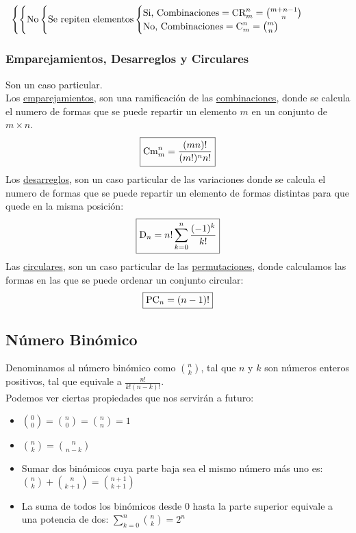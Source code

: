 \[\begin{cases}
\begin{cases}
                        \textnormal{No}\begin{cases}
                                \textnormal{Se repiten elementos}
                                \begin{cases}
                                        \textnormal{Si, Combinaciones} = \textnormal{CR}_m^n=\binom{m+n-1}{n} \\
                                        \textnormal{No, Combinaciones} = \textnormal{C}^n_m = \binom{m}{n}
                                \end{cases}
                        \end{cases}
                \end{cases}
        \end{cases}
\]
\subsubsection{Emparejamientos, Desarreglos y Circulares}
 Son un caso particular. \\ Los \underline{emparejamientos}, son una ramificación de las \underline{combinaciones}, donde se calcula el numero de formas que se puede repartir un elemento \(m\) en un conjunto de \(m \times n\).
\[
        \boxed{\textnormal{Cm}_m^n= \frac{(mn)!}{(m!)^{n}n!}}
\]
 Los \underline{desarreglos}, son un caso particular de las variaciones donde se calcula el numero de formas que se puede repartir un elemento de formas distintas para que quede en la misma posición:
\[
        \boxed{\textnormal{D}_n = n!\sum_{k=0}^n\frac{(-1)^k}{k!}}
\]
 Las \underline{circulares}, son un caso particular de las \underline{permutaciones}, donde calculamos las formas en las que se puede ordenar un conjunto circular:
\[
        \boxed{\textnormal{PC}_n = (n-1)!}
\]
\subsection{Número Binómico}
 Denominamos al número binómico como \(\binom{n}{k}\), tal que \(n\) y \(k\) son números enteros positivos, tal que equivale a \(\frac{n!}{k!(n-k)!}\).\\
Podemos ver ciertas propiedades que nos servirán a futuro:
\begin{itemize}
        \item \(\binom{0}{0} = \binom{n}{0} = \binom{n}{n} = 1\)
        \item \(\binom{n}{k} = \binom{n}{n-k}\)
        \item Sumar dos binómicos cuya parte baja sea el mismo número más uno es: \(\binom{n}{k} + \binom{n}{k+1} = \binom{n+1}{k+1}\)
        \item La suma de todos los binómicos desde 0 hasta la parte superior equivale a una potencia de dos: \(\sum_{k=0}^n \binom{n}{k} = 2^n\)
\end{itemize}

